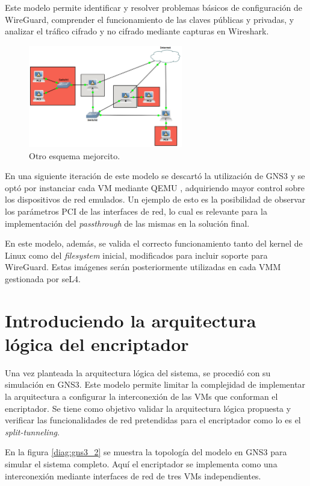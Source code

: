 Este modelo permite identificar y resolver problemas básicos de configuración de WireGuard, comprender el funcionamiento de las claves públicas y privadas, y analizar el tráfico cifrado y no cifrado mediante capturas en Wireshark.

\begin{figure}[h!]
    \centering
    \includegraphics[width=0.6\textwidth]{../figs/gns3_1.png}
    \caption{Otro esquema mejorcito.}
    \label{diag:wg_minimal}
\end{figure}

En una siguiente iteración de este modelo se descartó la utilización de GNS3 y se optó por instanciar cada VM mediante QEMU%
, adquiriendo mayor control sobre los dispositivos de red emulados. Un ejemplo de esto es la posibilidad de observar los parámetros PCI de las interfaces de red, lo cual es relevante para la implementación del \textit{passthrough} de las mismas en la solución final.

En este modelo, además, se valida el correcto funcionamiento tanto del kernel de Linux como del \textit{filesystem} inicial, modificados para incluir soporte para WireGuard. Estas imágenes serán posteriormente utilizadas en cada VMM gestionada por seL4.

\section{Introduciendo la arquitectura lógica del encriptador}
Una vez planteada la arquitectura lógica del sistema, se procedió con su simulación en GNS3. Este modelo permite limitar la complejidad de implementar la arquitectura a configurar la interconexión de las VMs que conforman el encriptador. Se tiene como objetivo validar la arquitectura lógica propuesta y verificar las funcionalidades de red pretendidas para el encriptador como lo es el \textit{split-tunneling}.

En la figura \ref{diag:gns3_2} se muestra la topología del modelo en GNS3 para simular el sistema completo. Aquí el encriptador se implementa como una interconexión mediante interfaces de red de tres VMs independientes. 

